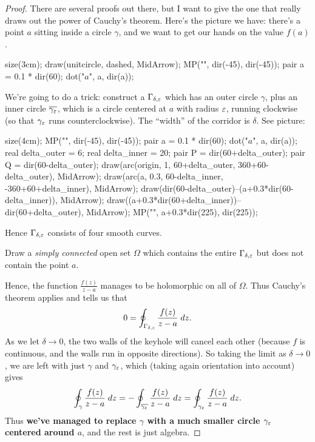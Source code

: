 \begin{proof}
	There are several proofs out there, but I want to give the one that really
	draws out the power of Cauchy's theorem. Here's the picture we have:
	there's a point $a$ sitting inside a circle $\gamma$,
	and we want to get our hands on the value $f(a)$.
	\begin{center}
		\begin{asy}
			size(3cm);
			draw(unitcircle, dashed, MidArrow);
			MP("\gamma", dir(-45), dir(-45));
			pair a = 0.1 * dir(60);
			dot("$a$", a, dir(a));
		\end{asy}
	\end{center}
	We're going to do a trick: construct a  $\Gamma_{\delta, \varepsilon}$
	which has an outer circle $\gamma$, plus an inner circle $\overline{\gamma_\varepsilon}$, which is a circle centered
	at $a$ with radius $\varepsilon$, running clockwise (so that $\gamma_\varepsilon$ runs counterclockwise).
	The ``width'' of the corridor is $\delta$. See picture:
	\begin{center}
		\begin{asy}
			size(4cm);
			MP("\gamma", dir(-45), dir(-45));
			pair a = 0.1 * dir(60);
			dot("$a$", a, dir(a));
			real delta_outer = 6;
			real delta_inner = 20;
			pair P = dir(60+delta_outer);
			pair Q = dir(60-delta_outer);
			draw(arc(origin, 1, 60+delta_outer, 360+60-delta_outer), MidArrow);
			draw(arc(a, 0.3, 60-delta_inner, -360+60+delta_inner), MidArrow);
			draw(dir(60-delta_outer)--(a+0.3*dir(60-delta_inner)), MidArrow);
			draw((a+0.3*dir(60+delta_inner))--dir(60+delta_outer), MidArrow);
			MP("\overline{\gamma_\varepsilon}", a+0.3*dir(225), dir(225));
		\end{asy}
	\end{center}
	Hence $\Gamma_{\delta,\varepsilon}$ consists of four smooth curves.
	\begin{ques}
		Draw a \emph{simply connected} open set $\Omega$ which contains the entire
		$\Gamma_{\delta,\varepsilon}$ but does not contain the point $a$.
	\end{ques}
	Hence, the function $\frac{f(z)}{z-a}$ manages to be holomorphic on all of $\Omega$.
	Thus Cauchy's theorem applies and tells us that
	\[
		0 = \oint_{\Gamma_{\delta,\varepsilon}} \frac{f(z)}{z-a} \; dz.
	\]
	As we let $\delta \to 0$, the two walls of the keyhole will cancel each other (because $f$ is continuous,
	and the walls run in opposite directions).
	So taking the limit as $\delta \to 0$, we are left with just $\gamma$ and $\gamma_\varepsilon$, 
	which (taking again orientation into account) gives
	\[
		\oint_{\gamma} \frac{f(z)}{z-a} \; dz
		= - \oint_{\overline{\gamma_\varepsilon}} \frac{f(z)}{z-a} \; dz
		= \oint_{\gamma_\varepsilon} \frac{f(z)}{z-a} \; dz.
	\]
	Thus \textbf{we've managed to replace $\gamma$ with a much smaller circle $\gamma_\varepsilon$ centered around $a$},
	and the rest is just algebra.


\end{proof}
